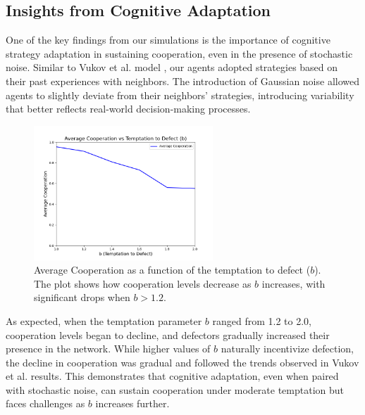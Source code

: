 \documentclass[runningheads]{llncs}
\begin{document}
\subsection{Insights from Cognitive Adaptation}
One of the key findings from our simulations is the importance of cognitive strategy adaptation in sustaining cooperation, even in the presence of stochastic noise. Similar to Vukov et al. model \cite{vukov}, our agents adopted strategies based on their past experiences with neighbors. The introduction of Gaussian noise allowed agents to slightly deviate from their neighbors' strategies, introducing variability that better reflects real-world decision-making processes.

\begin{figure}[H]
    \centering
    \includegraphics[width=0.6\textwidth]{cooperation_vs_b.png}
    \caption{Average Cooperation as a function of the temptation to defect (\( b \)). The plot shows how cooperation
    levels decrease as \( b \) increases, with significant drops when \( b > 1.2 \).}
    \label{fig:coop_vs_b}
\end{figure}

As expected, when the temptation parameter \( b \) ranged from 1.2 to 2.0, cooperation levels began to decline,
and defectors gradually increased their presence in the network.
While higher values of \( b \) naturally incentivize defection, the decline in
cooperation was gradual and followed the trends observed in Vukov et al. \cite{vukov}
results. This demonstrates that cognitive adaptation, even when paired
with stochastic noise, can sustain cooperation under moderate temptation but
faces challenges as \( b \) increases further.
\end{document}
